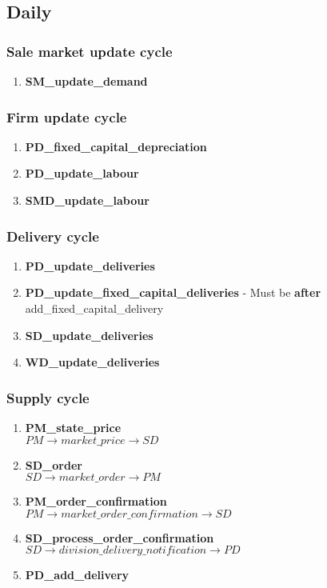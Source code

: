 \documentclass[11pt]{article}
\begin{document}
\subsection{Daily}

\subsubsection{Sale market update cycle}
\begin{enumerate}
	\item \textbf{SM\_update\_demand}
\end{enumerate}

\subsubsection{Firm update cycle}
\begin{enumerate}
	\item \textbf{PD\_fixed\_capital\_depreciation}
	\item \textbf{PD\_update\_labour}
	\item \textbf{SMD\_update\_labour}
\end{enumerate}

\subsubsection{Delivery cycle}
\begin{enumerate}
	\item \textbf{PD\_update\_deliveries}
	\item \textbf{PD\_update\_fixed\_capital\_deliveries} - Must be \textbf{after} add\_fixed\_capital\_delivery
	\item \textbf{SD\_update\_deliveries}
	\item \textbf{WD\_update\_deliveries}
\end{enumerate}

\subsubsection{Supply cycle}
\begin{enumerate}
	\item \textbf{PM\_state\_price} \\
	$ PM \rightarrow market\_price \rightarrow SD $
	\item \textbf{SD\_order} \\
	$ SD \rightarrow market\_order \rightarrow PM $
	\item \textbf{PM\_order\_confirmation} \\
	$ PM \rightarrow market\_order\_confirmation \rightarrow SD $
	\item \textbf{SD\_process\_order\_confirmation} \\
	$ SD \rightarrow division\_delivery\_notification \rightarrow PD $
	\item \textbf{PD\_add\_delivery}
		
\end{enumerate}
\end{document}
